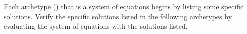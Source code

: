 Each archetype () that is a system of equations begins by listing some specific solutions.  Verify the specific solutions listed in the following archetypes by evaluating the system of equations with the solutions listed.\\
\\ 
\\ 
\\ 
\\ 
\\ 
\\ 
\\ 
\\ 
\\
